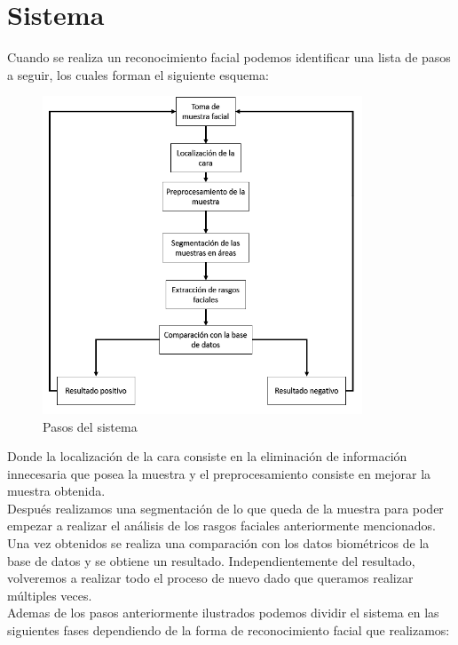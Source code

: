 \chapter{Sistema}

Cuando se realiza un reconocimiento facial podemos identificar una lista de pasos a seguir, los cuales forman el siguiente esquema:\\

\begin{figure}[H]
    \centering
    \includegraphics[width=0.85\textwidth]{Sistema.png}
    \caption{Pasos del sistema}
\end{figure}

Donde la localización de la cara consiste en la eliminación de información innecesaria que posea la muestra y el preprocesamiento consiste en mejorar la muestra obtenida.\\
Después realizamos una segmentación de lo que queda de la muestra para poder empezar a realizar el análisis de los rasgos faciales anteriormente mencionados. Una vez obtenidos se realiza una comparación con los datos biométricos de la base de datos y se obtiene un resultado. Independientemente del resultado, volveremos a realizar todo el proceso de nuevo dado que queramos realizar múltiples veces.\\

Ademas de los pasos anteriormente ilustrados podemos dividir el sistema en las siguientes fases dependiendo de la forma de reconocimiento facial que realizamos:\\

